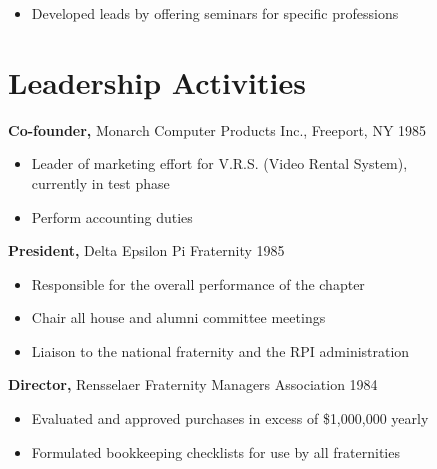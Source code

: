 \documentclass[line]{res}
\begin{document}
\begin{resume}
\begin{itemize}
                 \item Developed leads by offering seminars for specific 
                 professions 

         \end{itemize}

\section{Leadership   Activities} 
               {\bf Co-founder,} Monarch Computer Products Inc., Freeport, NY    \hfill         1985 
                \begin{itemize} \itemsep -2pt
              \item Leader of marketing effort for V.R.S. (Video 
                 Rental System), \\
                  currently in test phase 
                 
                \item  Perform accounting duties 

         \end{itemize}

        {\bf President,} Delta Epsilon Pi Fraternity \hfill   1985 
                \begin{itemize} \itemsep -2pt
                 \item  Responsible for the overall performance of the 
                 chapter 
                
                 \item Chair all house and alumni committee meetings 
                
                 \item Liaison to the national fraternity and the RPI 
                 administration 
         \end{itemize}

                  {\bf  Director,}  Rensselaer Fraternity Managers 
              Association     \hfill                                 1984 
                 \begin{itemize} \itemsep -2pt

               \item    Evaluated and approved purchases in excess of 
                 {\$}1,000,000 yearly 
                 
               \item  Formulated bookkeeping checklists for use by all 
                 fraternities 
         \end{itemize}


\end{resume}
\end{document}
